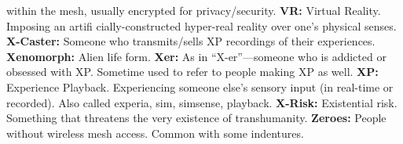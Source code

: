 within the mesh, usually encrypted for privacy/security.
\textbf{ VR:} Virtual Reality. Imposing an artiﬁ cially-constructed 
hyper-real reality over one's physical senses.
\textbf{ X-Caster:} Someone who transmits/sells XP recordings of 
their experiences.
\textbf{ Xenomorph:} Alien life form.
\textbf{ Xer:} As in ``X-er''—someone who is addicted or 
obsessed with XP. Sometime used to refer to people 
making XP as well.
\textbf{ XP:} Experience Playback. Experiencing someone else's 
sensory input (in real-time or recorded). Also called 
experia, sim, simsense, playback.
\textbf{ X-Risk:} Existential risk. Something that threatens the 
very existence of transhumanity.
\textbf{ Zeroes:} People without wireless mesh access. Common 
with some indentures.


